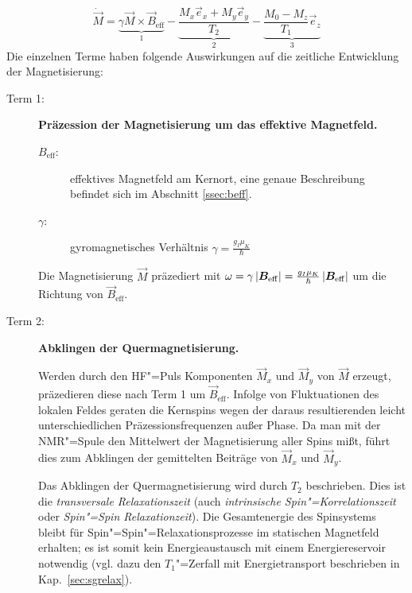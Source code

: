\begin{equation}
	\label{eqn:bloch}
	\dot{\vec M} = \underbrace{\gamma {\vec M} \times \vec B_\mathrm{eff}}_1
				 - \underbrace{\frac{M_x \vec e_x + M_y \vec e_y}{T_2}}_2
				 - \underbrace{\frac{M_0-M_z}{T_1}\vec e_z}_3
\end{equation}
Die einzelnen Terme haben folgende Auswirkungen auf die zeitliche Entwicklung der Magnetisierung:
\begin{description}
	\item[Term 1:] {\bfseries Präzession der Magnetisierung um das effektive Magnetfeld.}
		\begin{description}
			\item[$B_\mathrm{eff}$:] effektives Magnetfeld am Kernort, eine genaue Beschreibung
				befindet sich im Abschnitt \ref{ssec:beff}.
			\item[$\gamma$:] gyromagnetisches Verhältnis $\gamma=\frac{g_I\mu_K}{\hbar}$
		\end{description}

		Die Magnetisierung $\vec M$ präzediert mit $\omega=\gamma \abs{\vec
		B_\mathrm{eff}}=\frac{g_I\mu_K}{\hbar}\abs{\vec B_\mathrm{eff}}$ um die Richtung von $\vec
		B_\mathrm{eff}$.
	\item[Term 2:] {\bfseries Abklingen der Quermagnetisierung.}

		Werden durch den HF"=Puls Komponenten $\vec M_x$ und $\vec M_y$ von $\vec M$ erzeugt,
		präzedieren diese nach Term 1 um $\vec B_\mathrm{eff}$.
		Infolge von Fluktuationen des lokalen Feldes geraten die Kernspins wegen der daraus
		resultierenden leicht unterschiedlichen Präzessionsfrequenzen außer
		Phase. Da man mit der NMR"=Spule den Mittelwert der Magnetisierung aller Spins
		mißt, führt dies zum Abklingen der gemittelten Beiträge von $\vec M_x$ und $\vec M_y$.

		Das Abklingen der Quermagnetisierung wird durch $T_2$ beschrieben. Dies ist die
		\emph{transversale Relaxationszeit} (auch \emph{intrinsische
		Spin"=Korrelationszeit} oder \emph{Spin"=Spin Relaxationzeit}). Die Gesamtenergie des
		Spinsystems bleibt für Spin"=Spin"=Relaxationsprozesse im statischen Magnetfeld erhalten; es
		ist somit kein Energieaustausch mit einem Energiereservoir notwendig (vgl. dazu den
		$T_1$"=Zerfall mit Energietransport beschrieben in Kap.~\ref{sec:sgrelax}).


\end{description}
